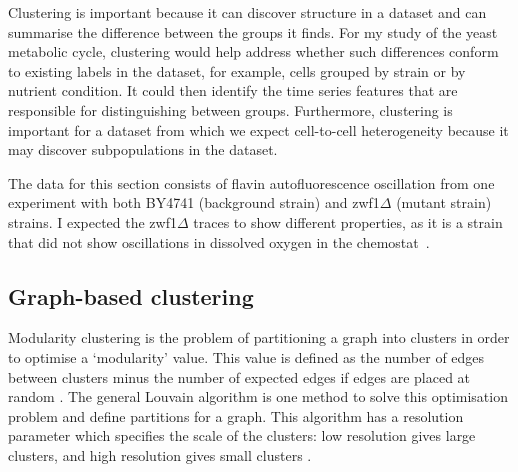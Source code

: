 Clustering is important because it can discover structure in a dataset and can summarise the difference between the groups it finds.
For my study of the yeast metabolic cycle, clustering would help address whether such differences conform to existing labels in the dataset, for example, cells grouped by strain or by nutrient condition.
It could then identify the time series features that are responsible for distinguishing between groups.
Furthermore, clustering is important for a dataset from which we expect cell-to-cell heterogeneity because it may discover subpopulations in the dataset.

The data for this section consists of flavin autofluorescence oscillation from one experiment with both BY4741 (background strain) and zwf1$\Delta$ (mutant strain) strains.
I expected the zwf1$\Delta$ traces to show different properties, as it is a strain that did not show oscillations in dissolved oxygen in the chemostat~\parencite{tuCyclicChangesMetabolic2007}.


\subsection{Graph-based clustering}
\label{subsec:analysis-clustering-graphclustering}


Modularity clustering is the problem of partitioning a graph into clusters in order to optimise a `modularity' value.
This value is defined as the number of edges between clusters minus the number of expected edges if edges are placed at random \parencite{newmanModularityCommunityStructure2006}.
The general Louvain algorithm \parencite{blondelFastUnfoldingCommunities2008,muchaCommunityStructureTimeDependent2010} is one method to solve this optimisation problem and define partitions for a graph.
This algorithm has a resolution parameter which specifies the scale of the clusters: low resolution gives large clusters, and high resolution gives small clusters \parencite{fortunatoResolutionLimitCommunity2007}.

